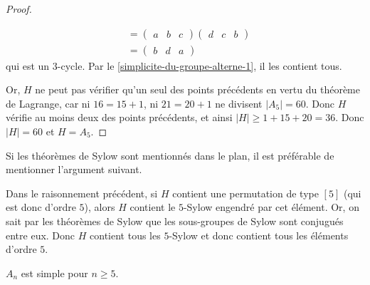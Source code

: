 \begin{proof}
\begin{itemize}
\begin{align*}
        &= \begin{pmatrix} a & b & c \end{pmatrix} \begin{pmatrix} d & c & b \end{pmatrix} \\
        &= \begin{pmatrix} b & d & a \end{pmatrix}
      \end{align*}
      qui est un $3$-cycle. Par le \cref{simplicite-du-groupe-alterne-1}, il les contient tous.
    \end{itemize}
    Or, $H$ ne peut pas vérifier qu'un seul des points précédents en vertu du théorème de Lagrange, car ni $16 = 15 + 1$, ni $21 = 20 + 1$ ne divisent $|A_5| = 60$. Donc $H$ vérifie au moins deux des points précédents, et ainsi $|H| \geq 1 + 15 + 20 = 36$. Donc $|H|=60$ et $H = A_5$.
  \end{proof}


  Si les théorèmes de Sylow sont mentionnés dans le plan, il est préférable de mentionner l'argument suivant.

  \begin{remark}
    Dans le raisonnement précédent, si $H$ contient une permutation de type $[5]$ (qui est donc d'ordre $5$), alors $H$ contient le $5$-Sylow engendré par cet élément. Or, on sait par les théorèmes de Sylow que les sous-groupes de Sylow sont conjugués entre eux. Donc $H$ contient tous les $5$-Sylow et donc contient tous les éléments d'ordre $5$.
  \end{remark}

  \begin{theorem}
    $A_n$ est simple pour $n \geq 5$.
  \end{theorem}

